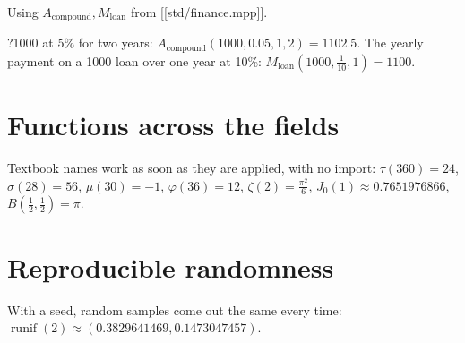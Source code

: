 \documentclass[11pt,a4paper]{article}
\theoremstyle{plain}
\theoremstyle{definition}
\theoremstyle{remark}
\begin{document}
Using $A_{\text{compound}}, M_{\text{loan}}$ from [[std/finance.mpp]].

?1000 at 5\% for two years: $A_{\text{compound}}(1000, 0.05, 1, 2) = 1102.5$. The yearly payment on a 1000 loan over one year at 10\%: $M_{\text{loan}}(1000, \tfrac{1}{10}, 1) = 1100$.

\section*{Functions across the fields}

Textbook names work as soon as they are applied, with no import: $\tau(360) = 24$, $\sigma(28) = 56$, $\mu(30) = -1$, $\varphi(36) = 12$, $\zeta(2) = \frac{\pi^{2}}{6}$, $J_0(1) \approx 0.7651976866$, $B(\tfrac{1}{2}, \tfrac{1}{2}) = \pi$.

\section*{Reproducible randomness}

With a seed, random samples come out the same every time: $\operatorname{runif}(2) \approx (0.3829641469, 0.1473047457)$.
\end{document}
